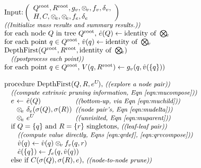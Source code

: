 \documentclass[twoside,leqno,twocolumn]{article}
\newcommand{\com}[1]{{\small \textit{((#1))}}}
\newcommand{\summary}{\delta}
\newcommand{\psty}{}
\newcommand{\X}{\\ \psty}
\newcommand{\x}{\X \hspace{0.13in}}
\newcommand{\xx}{\X \hspace{0.26in}}
\newcommand{\kdroot}[1]{#1^{\text{root}}}
\newcommand{\nameOp}[2]{\mathop{#1\nolimits\!\!_{#2}}}
\newcommand{\nameop}[2]{#1_{\!#2}}
\newcommand{\myOp}[1]{\nameOp{\bigotimes}{#1}}
\newcommand{\myop}[1]{\nameop{\otimes}{#1}}
\newcommand{\letterqr}{v}
\newcommand{\outqr}{V}
\newcommand{\Opqr}{\myOp{\letterqr}}
\newcommand{\opqr}{\myop{\letterqr}}
\newcommand{\fqr}{f_{\letterqr}}
\newcommand{\gqr}{g_{\letterqr}}
\newcommand{\letterqrv}{v}
\newcommand{\deltaqrv}{\summary_{\letterqrv}}
\newcommand{\varqr}{\hat{\letterqr}}
\newcommand{\lettermu}{e}
\newcommand{\inmu}{e}
\newcommand{\outopmu}{\myop{\lettermu}}
\newcommand{\Opmu}{\myOp{\lettermu}}
\newcommand{\opmu}{\myop{\lettermu}}
\newcommand{\fmu}{f_{\lettermu}}
\newcommand{\fmuv}{f_{\lettermu}}
\newcommand{\deltamu}{\summary_{\lettermu}}
\newcommand{\canprunemu}{C}
\newcommand{\heurqr}{H}
\newcommand{\varmuchild}{\hat{\lettermu}}
\newcommand{\varmuparent}{\lettermu^{U\!}}
\newcommand{\outstat}{\sigma}
\begin{document}
\begin{figure}
  \vspace{-0.3in}
\[
  \begin{array}[t]{l}
    \\ \text{Input:}\left(
        \begin{array}[c]{l}\kdroot{Q}, \kdroot{R}, \gqr, \opqr, \fqr, \deltaqrv, \\ \heurqr, \canprunemu, \outopmu, \opmu, \fmuv, \deltamu\end{array}\right)
    \X \text{\com{Initialize mass results and summary results.}}
    \X \text{for each node } Q \text{ in tree } \kdroot{Q}\text{, } \varmuchild(Q) \gets \text{identity of }\Opmu
    \X \text{for each point } q \in \kdroot{Q}\text{, } \varqr(q) \gets \text{identity of }\Opqr
    \X \text{DepthFirst}(\kdroot{Q}, \kdroot{R}, \text{identity of }\Opmu)
    \x \text{\com{postprocess each point}}
    \X \text{for each point } q \in \kdroot{Q}\text{, } \outqr(q, \kdroot{R}) \gets \gqr(q, \varqr(\{q\}))
    \X
    \X \text{procedure DepthFirst}(Q, R, \varmuparent)\text{, \com{explore a node pair}}
    \x \text{\com{compute extrinsic pruning information, Eqn~\ref{eqn:mucompose}}}
    \x \!\!\!\begin{array}{llll}
         \psty\lettermu &\psty\!\!\!\!\gets\!\!\!\!& \psty\varmuchild(Q)                     & \!\!\!\text{\com{bottom-up, via Eqn~\ref{eqn:muchild}}}
         \\             &\psty\!\!\!\!\opmu\!\!\!\!& \psty\deltamu(\outstat(Q), \outstat(R)) & \!\!\!\text{\com{node pair's, Eqn~\ref{eqn:mudelta}}}
         \\             &\psty\!\!\!\!\opmu\!\!\!\!& \psty\varmuparent                       & \!\!\!\text{\com{unvisited, Eqn~\ref{eqn:muparent}}}
       \end{array}
    \x \text{if } Q = \{q\}\text{ and }R = \{r\}\text{ singletons, \com{leaf-leaf pair}}
    \xx \text{\com{compute value directly, Eqns \ref{eqn:qrdef}, \ref{eqn:qrvcompose}}}
    \xx \varqr(q) \gets \varqr(q) \opqr \fqr(q, r)
    \xx \varmuchild(\{q\}) \gets \fmu(q, \varqr(q))
    \x \text{else if } \canprunemu(\outstat(Q), \outstat(R), \lettermu)\text{, \com{node-to-node prune}}

\end{array}\]
\end{figure}
\end{document}

